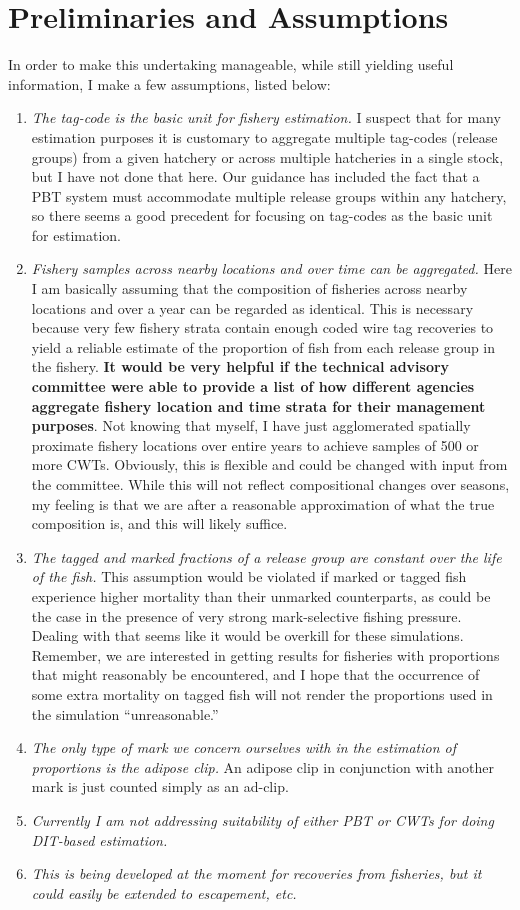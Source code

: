 \documentclass[11pt]{article}
\makeatletter
\newcommand{\etc}{{\em etc.}\@\xspace}
\makeatother
\begin{document}
\section{Preliminaries and Assumptions \label{sec:prelims}}

In order to make this undertaking manageable, while still yielding useful information, I make
a few assumptions, listed below:
\begin{enumerate}
\item {\sl The tag-code is the basic unit for fishery estimation.} I suspect that for many estimation purposes
it is customary to aggregate multiple tag-codes (release groups) from a given hatchery or across multiple
hatcheries in a single stock, but I have not done that here.  Our guidance has included the fact that a 
PBT system must accommodate multiple release groups within any hatchery, so
there seems a good precedent for focusing on tag-codes as the basic unit for estimation.
\item {\sl Fishery samples across nearby locations and over time can be aggregated. } Here I am basically assuming
that the composition of fisheries across nearby locations and over a year can be regarded as identical.  This is
necessary because very few fishery strata contain enough coded wire tag recoveries to yield a reliable estimate
of the proportion of fish from each release group in the fishery. {\bf It would be very helpful if the technical
advisory committee were able to provide a list of how
different agencies aggregate fishery location and time strata for their management purposes}.
Not knowing that myself, I have just agglomerated spatially
proximate fishery locations over entire years to achieve samples of 500 or more CWTs.  Obviously, this is 
flexible and could be changed with input from the committee.   While this will not
reflect compositional changes over seasons, my feeling is
that we are after a reasonable approximation of what the true composition is, and this will likely
suffice.
\item {\sl The tagged and marked fractions of a release group are constant over the life of the fish.}  This
assumption would be violated if marked or tagged fish experience higher mortality than their unmarked
counterparts, as could be the case in the presence of very strong mark-selective fishing pressure.  Dealing with
that seems like it would be overkill for these simulations.  Remember, we are interested in getting results
for fisheries with proportions that might reasonably be encountered, and I hope that the occurrence of
some extra mortality on tagged fish will not render the proportions used in the simulation ``unreasonable.''
\item {\sl The only type of mark we concern ourselves with in the estimation of proportions is the
adipose clip.}  An adipose clip in conjunction with another mark is just counted simply as an ad-clip.
\item {\sl Currently I am not addressing suitability of either PBT or CWTs for doing DIT-based estimation.}
\item {\sl This is being developed at the moment for recoveries from fisheries, but it could easily be extended to
escapement, \etc}
\end{enumerate}
\end{document}
